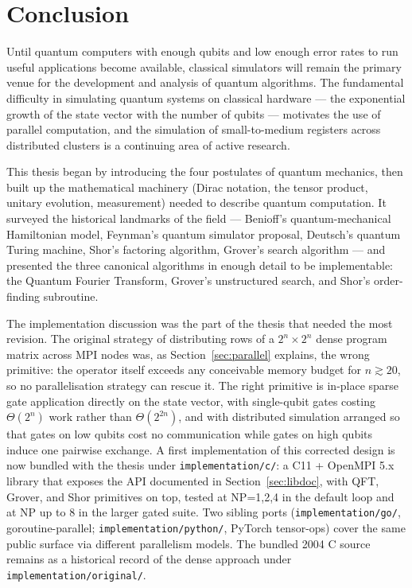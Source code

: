 \setcounter{equation}{0}
\section{Conclusion}

Until quantum computers with enough qubits and low enough error rates to run useful applications become available, classical simulators will remain the primary venue for the development and analysis of quantum algorithms. The fundamental difficulty in simulating quantum systems on classical hardware --- the exponential growth of the state vector with the number of qubits --- motivates the use of parallel computation, and the simulation of small-to-medium registers across distributed clusters is a continuing area of active research.

This thesis began by introducing the four postulates of quantum mechanics, then built up the mathematical machinery (Dirac notation, the tensor product, unitary evolution, measurement) needed to describe quantum computation. It surveyed the historical landmarks of the field --- Benioff's quantum-mechanical Hamiltonian model, Feynman's quantum simulator proposal, Deutsch's quantum Turing machine, Shor's factoring algorithm, Grover's search algorithm --- and presented the three canonical algorithms in enough detail to be implementable: the Quantum Fourier Transform, Grover's unstructured search, and Shor's order-finding subroutine.

The implementation discussion was the part of the thesis that needed the most revision. The original strategy of distributing rows of a $2^n \times 2^n$ dense program matrix across MPI nodes was, as Section~\ref{sec:parallel} explains, the wrong primitive: the operator itself exceeds any conceivable memory budget for $n \gtrsim 20$, so no parallelisation strategy can rescue it. The right primitive is in-place sparse gate application directly on the state vector, with single-qubit gates costing $\Theta(2^n)$ work rather than $\Theta(2^{2n})$, and with distributed simulation arranged so that gates on low qubits cost no communication while gates on high qubits induce one pairwise exchange. A first implementation of this corrected design is now bundled with the thesis under \texttt{implementation/c/}: a C11 + OpenMPI 5.x library that exposes the API documented in Section~\ref{sec:libdoc}, with QFT, Grover, and Shor primitives on top, tested at NP=1,2,4 in the default loop and at NP up to $8$ in the larger gated suite. Two sibling ports (\texttt{implementation/go/}, goroutine-parallel; \texttt{implementation/python/}, PyTorch tensor-ops) cover the same public surface via different parallelism models. The bundled 2004 C source remains as a historical record of the dense approach under \texttt{implementation/original/}.

